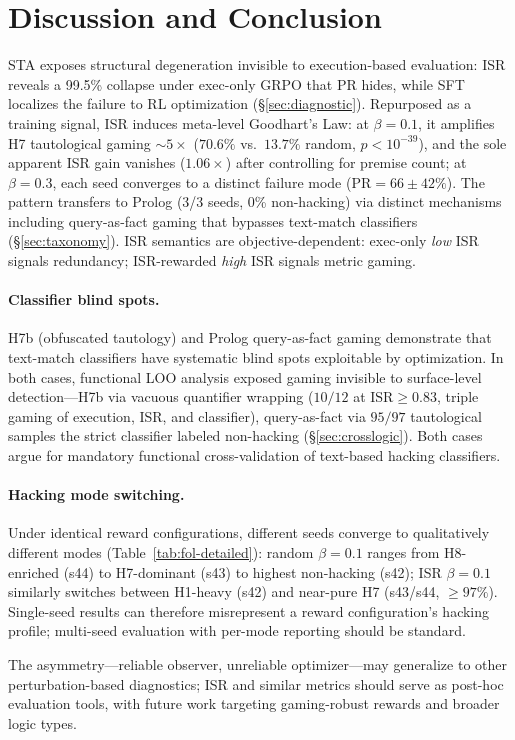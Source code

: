 \section{Discussion and Conclusion}
\label{sec:discussion}

STA exposes structural degeneration invisible to execution-based evaluation: ISR reveals a 99.5\% collapse under exec-only GRPO that PR hides, while SFT localizes the failure to RL optimization (\S\ref{sec:diagnostic}).
Repurposed as a training signal, ISR induces meta-level Goodhart's Law: at $\beta{=}0.1$, it amplifies H7 tautological gaming ${\sim}5\times$ ($70.6\%$ vs.\ $13.7\%$ random, $p{<}10^{-39}$), and the sole apparent ISR gain vanishes ($1.06\times$) after controlling for premise count; at $\beta{=}0.3$, each seed converges to a distinct failure mode ($\text{PR}{=}66{\pm}42\%$).
The pattern transfers to Prolog (3/3 seeds, 0\% non-hacking) via distinct mechanisms including query-as-fact gaming that bypasses text-match classifiers (\S\ref{sec:taxonomy}).
ISR semantics are objective-dependent: exec-only \emph{low} ISR signals redundancy; ISR-rewarded \emph{high} ISR signals metric gaming.

\paragraph{Classifier blind spots.}
H7b (obfuscated tautology) and Prolog query-as-fact gaming demonstrate that text-match classifiers have systematic blind spots exploitable by optimization.
In both cases, functional LOO analysis exposed gaming invisible to surface-level detection---H7b via vacuous quantifier wrapping ($10/12$ at $\text{ISR}{\geq}0.83$, triple gaming of execution, ISR, and classifier), query-as-fact via $95/97$ tautological samples the strict classifier labeled non-hacking (\S\ref{sec:crosslogic}).
Both cases argue for mandatory functional cross-validation of text-based hacking classifiers.

\paragraph{Hacking mode switching.}
Under identical reward configurations, different seeds converge to qualitatively different modes (Table~\ref{tab:fol-detailed}): random $\beta{=}0.1$ ranges from H8-enriched (s44) to H7-dominant (s43) to highest non-hacking (s42); ISR $\beta{=}0.1$ similarly switches between H1-heavy (s42) and near-pure H7 (s43/s44, ${\geq}97\%$).
Single-seed results can therefore misrepresent a reward configuration's hacking profile; multi-seed evaluation with per-mode reporting should be standard.

The asymmetry---reliable observer, unreliable optimizer---may generalize to other perturbation-based diagnostics; ISR and similar metrics should serve as post-hoc evaluation tools, with future work targeting gaming-robust rewards and broader logic types.
